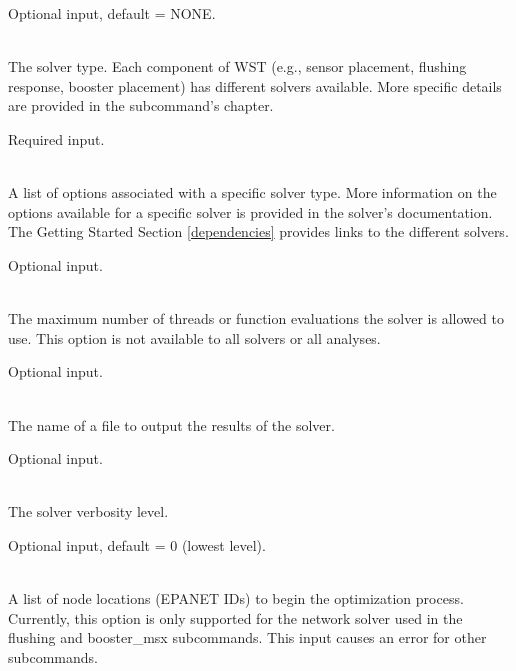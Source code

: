 \begin{description}[topsep=0pt,parsep=0.5em,itemsep=-0.4em]
\begin{description}[topsep=0pt,parsep=0.5em,itemsep=-0.4em]
\begin{description}[topsep=0pt,parsep=0.5em,itemsep=-0.4em]
                Optional input, default = NONE.
    \end{description}
  \end{description}
  \item[{solver}]\hfill
  \begin{description}[topsep=0pt,parsep=0.5em,itemsep=-0.4em]
    \item[{type}]\hfill
\\The solver type. Each component of WST
				(e.g., sensor placement, flushing response, booster 
				placement) has different 
				solvers available. More specific details are provided in 
				the subcommand's chapter.
                
                Required input.
    \item[{options}]\hfill
\\A list of options associated with a specific solver type. More
            information on the options available for a specific solver
            is provided in the solver's documentation. The Getting
            Started Section \ref{dependencies} provides links to the
            different solvers.
            
            Optional input.
    \item[{threads}]\hfill
\\The maximum number of threads or function evaluations the solver is
                allowed to use.  This option is not available to all solvers or all analyses.
                
                Optional input.
    \item[{logfile}]\hfill
\\The name of a file to output the results of the solver.
                
                Optional input.
    \item[{verbose}]\hfill
\\The solver verbosity level.
                
                Optional input, default = 0 (lowest level).
    \item[{initial points}]\hfill
    \begin{description}[topsep=0pt,parsep=0.5em,itemsep=-0.4em]
      \item[{nodes}]\hfill
\\A list of node locations (EPANET IDs) to begin the optimization
        process. Currently, this option is only supported for the
        network solver used in the flushing and booster\_msx
        subcommands. This input causes an error for other subcommands.
        

\end{description}
\end{description}
\end{description}
